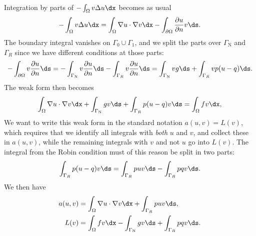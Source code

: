 Integration by parts of $-\int_\Omega v\Delta u\dx$ becomes as usual
\begin{equation}
 -\int_\Omega v\Delta u \dx
= \int_\Omega\nabla u\cdot \nabla v\dx
  - \int_{\partial\Omega} \frac{\partial u}{\partial n}v\ds.
\end{equation}
The boundary integral vanishes on $\Gamma_0\cup\Gamma_1$, and we split the
parts over $\Gamma_{\mathrm{N}}$ and $\Gamma_R$ since we have different conditions
at those parts:
\begin{equation}
- \int_{\partial\Omega}v \frac{\partial u}{\partial n}\ds
=
-\int_{\Gamma_{\mathrm{N}}}v \frac{\partial u}{\partial n}\ds
 - \int_{\Gamma_R}v \frac{\partial u}{\partial n}\ds
= \int_{\Gamma_{\mathrm{N}}}vg\ds
+ \int_{\Gamma_R}vp(u-q)\ds.
\end{equation}
The weak form then becomes
\begin{equation}
\int_{\Omega} \nabla u\cdot \nabla v \dx
+ \int_{\Gamma_{\mathrm{N}}} gv\ds + \int_{\Gamma_R}p(u-q)v\ds
= \int_{\Omega} fv \dx,
\end{equation}
We want to write this weak form in the standard notation $a(u,v)=L(v)$,
which requires that we identify all integrals with \emph{both} $u$ and
$v$, and collect these in $a(u,v)$, while the remaining integrals with
$v$ and not $u$ go into $L(v)$.  The integral from the Robin condition
must of this reason be split in two parts:
\begin{equation}
 \int_{\Gamma_R}p(u-q)v\ds
= \int_{\Gamma_R}puv\ds - \int_{\Gamma_R}pqv\ds.
\end{equation}
We then have
\begin{align}
  a(u, v) &= \int_{\Omega} \nabla u\cdot \nabla v \dx
    + \int_{\Gamma_R}puv\ds,
  \label{langtangen:poisson:2D:DN3:var:a}
\\
  L(v) &= \int_{\Omega} fv \dx - \int_{\Gamma_{\mathrm{N}}} g v\ds + \int_{\Gamma_R}pqv\ds.
  \label{langtangen:poisson:2D:DN3:var:L}
\end{align}

